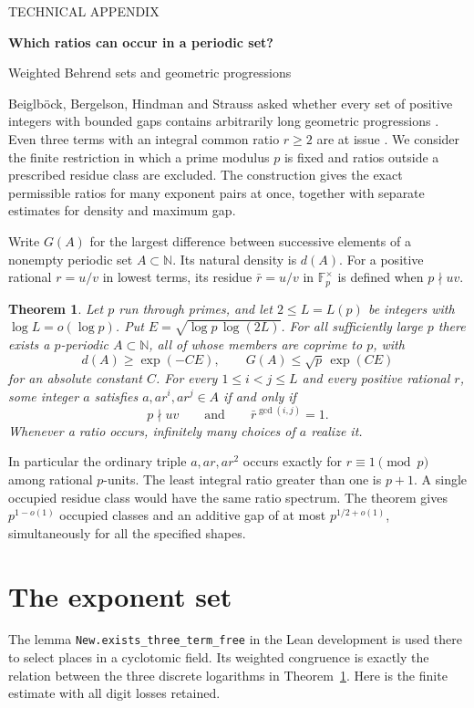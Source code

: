 \documentclass[11pt]{article}
\newcommand{\Fp}{\mathbb F_p}
\newcommand{\N}{\mathbb N}
\newtheorem{theorem}{Theorem}
\begin{document}
\begin{center}
{\small\sffamily TECHNICAL APPENDIX}\par\vspace{3pt}
{\LARGE\bfseries Which ratios can occur in a periodic set?}\par\vspace{5pt}
{\large Weighted Behrend sets and geometric progressions}
\end{center}

Beiglb\"ock, Bergelson, Hindman and Strauss asked whether every set of positive
integers with bounded gaps contains arbitrarily long geometric progressions
\cite{bbhs}. Even three terms with an integral common ratio $r\ge2$ are at issue
\cite{nath}. We consider the finite restriction in which a prime modulus $p$
is fixed and ratios outside a prescribed residue class are excluded. The
construction gives the exact permissible ratios for many exponent pairs at
once, together with separate estimates for density and maximum gap.

Write $G(A)$ for the largest difference between successive elements of a
nonempty periodic set $A\subset\N$. Its natural density is $d(A)$. For a
positive rational $r=u/v$ in lowest terms, its residue $\bar r=u/v$ in
$\Fp^\times$ is defined when $p\nmid uv$.

\begin{theorem}\label{main}
Let $p$ run through primes, and let $2\le L=L(p)$ be integers with
$\log L=o(\log p)$. Put $E=\sqrt{\log p\,\log(2L)}$. For all sufficiently
large $p$ there exists a $p$-periodic $A\subset\N$, all of whose members
are coprime to $p$, with
\[
          d(A)\ge \exp(-C E),\qquad G(A)\le\sqrt p\,\exp(C E)
\]
for an absolute constant $C$. For every $1\le i<j\le L$ and every positive
rational $r$, some integer $a$ satisfies $a,ar^i,ar^j\in A$ if and only if
\[
               p\nmid uv\qquad\text{and}\qquad \bar r^{\gcd(i,j)}=1.
\]
Whenever a ratio occurs, infinitely many choices of $a$ realize it.
\end{theorem}

In particular the ordinary triple $a,ar,ar^2$ occurs exactly for $r\equiv1
\pmod p$ among rational $p$-units. The least integral ratio greater than one
is $p+1$. A single occupied residue class would have the same ratio spectrum.
The theorem gives $p^{1-o(1)}$ occupied classes and an additive gap of at most
$p^{1/2+o(1)}$, simultaneously for all the specified shapes.

\section*{The exponent set}
The lemma \texttt{New.exists\_three\_term\_free} in the Lean development
\cite{lean} is used there to select places in a cyclotomic field. Its weighted
congruence is exactly the relation between the three discrete logarithms in
Theorem~\ref{main}. Here is the finite estimate with all digit losses retained.
\end{document}
